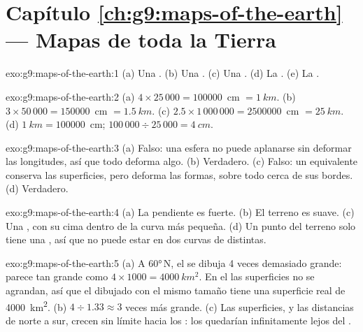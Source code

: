 \section*{Capítulo \ref{ch:g9:maps-of-the-earth} --- Mapas de toda la Tierra}

\begin{solution}{exo:g9:maps-of-the-earth:1}
(a) Una . (b) Una . (c) Una . (d) La . (e) La .
\end{solution}

\begin{solution}{exo:g9:maps-of-the-earth:2}
(a) $4 \times 25\,000 = \num{100000}$~cm $= \qty{1}{km}$. (b) $3 \times
50\,000 = \num{150000}$~cm $= \qty{1.5}{km}$. (c) $2.5 \times 1\,000\,000
= \num{2500000}$~cm $= \qty{25}{km}$. (d) $\qty{1}{km} = \num{100000}$~cm;
$100\,000 \div 25\,000 = \qty{4}{cm}$.
\end{solution}

\begin{solution}{exo:g9:maps-of-the-earth:3}
(a) Falso: una esfera no puede aplanarse sin deformar las longitudes, así
que todo  deforma algo. (b) Verdadero. (c) Falso: un 
equivalente conserva las superficies, pero deforma las formas, sobre todo
cerca de sus bordes. (d) Verdadero.
\end{solution}

\begin{solution}{exo:g9:maps-of-the-earth:4}
(a) La pendiente es fuerte. (b) El terreno es suave. (c) Una , con
su cima dentro de la curva más pequeña. (d) Un punto del terreno solo
tiene una , así que no puede estar en dos curvas de 
distintas.
\end{solution}

\begin{solution}{exo:g9:maps-of-the-earth:5}
(a) A \ang{60}\,N, el  se dibuja 4 veces demasiado grande: parece tan
grande como $4 \times 1000 = \qty{4000}{km^2}$. En el  las
superficies no se agrandan, así que el  dibujado con el mismo tamaño
tiene una superficie real de \qty{4000}{km^2}. (b) $4 \div 1.33 \approx 3$
veces más grande. (c) Las superficies, y las distancias de norte a sur,
crecen sin límite hacia los : los  quedarían infinitamente lejos
del .
\end{solution}

